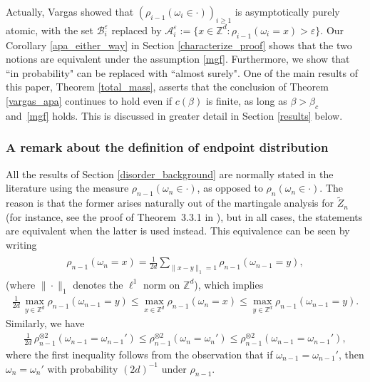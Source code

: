 \documentclass[11pt,reqno]{amsart}
\numberwithin{equation}{section}
\theoremstyle{definition}
\begin{document}
Actually, Vargas showed that $(\rho_{i-1}(\omega_i \in \cdot))_{i \geq 1}$ is asymptotically purely atomic, with the set ${\mathcal{B}}_i^{\varepsilon}$ replaced by ${\mathcal{A}}_i^{\varepsilon} := \{x \in {\mathbb{Z}}^d : \rho_{i-1}(\omega_i = x) > {\varepsilon}\}$.  Our Corollary \ref{apa_either_way} in Section \ref{characterize_proof} shows that the two notions are equivalent under the assumption \eqref{mgf}. Furthermore, we show that ``in probability" can be replaced with ``almost surely". One of the main results of this paper, Theorem \ref{total_mass}, asserts that the conclusion of Theorem \ref{vargas_apa} continues to hold even if $c(\beta)$ is finite, as long as $\beta > \beta_c$ and~\eqref{mgf} holds. This is discussed in greater detail in Section \ref{results} below.

\subsubsection{A remark about the definition of endpoint distribution}
All the results of Section \ref{disorder_background} are normally stated in the literature using the measure $\rho_{n-1}(\omega_n \in \cdot)$, as opposed to $\rho_n(\omega_n \in \cdot)$. 
The reason is that the former arises naturally out of the martingale analysis for ${\widetilde{{Z}}}_n$ (for instance, see the proof of Theorem~3.3.1 in \cite{comets-shiga-yoshida04}), but in all cases, the statements are equivalent when the latter is used instead.
This equivalence can be seen by writing
{\begin{align} \begin{split} {
\rho_{n-1}(\omega_n = x) = \frac{1}{2d} \sum_{\|x - y\|_1 = 1} \rho_{n-1}(\omega_{n-1} = y), \label{next_step}
} \end{split} \end{align}}
(where $\|\cdot\|_1$ denotes the $\ell^1$ norm on ${\mathbb{Z}}^d$), which implies
{\begin{align*} {
\frac{1}{2d}\, \max_{y \in {\mathbb{Z}}^d} \rho_{n-1}(\omega_{n-1} = y) \leq \max_{x \in {\mathbb{Z}}^d} \rho_{n-1}(\omega_n = x) \leq \max_{y \in {\mathbb{Z}}^d} \rho_{n-1}(\omega_{n-1} = y).
} \end{align*}}
Similarly, we have
{\begin{align*} {
\frac{1}{2d}\, \rho^{\otimes 2}_{n-1}(\omega_{n-1} = \omega_{n-1}') \leq \rho^{\otimes 2}_{n-1}(\omega_{n} = \omega_{n}') \leq \rho^{\otimes 2}_{n-1}(\omega_{n-1} = \omega_{n-1}'),
} \end{align*}}
where the first inequality follows from the observation that if $\omega_{n-1} = \omega_{n-1}'$, then $\omega_n = \omega_n'$ with probability $(2d)^{-1}$ under $\rho_{n-1}$.
\end{document}
